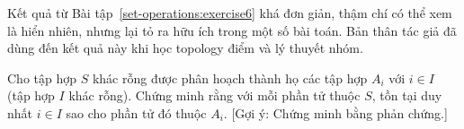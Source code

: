 Kết quả từ Bài tập~\ref{set-operations:exercise6} khá đơn giản, thậm chí có thể xem là hiển nhiên, nhưng lại tỏ ra hữu ích trong một số bài toán. Bản thân tác giả đã dùng đến kết quả này khi học topology điểm và lý thuyết nhóm.

\begin{exercise}\label{set-operations:exercise7}
    Cho tập hợp $S$ khác rỗng được phân hoạch thành họ các tập hợp $A_{i}$ với $i\in I$ (tập hợp $I$ khác rỗng). Chứng minh rằng với mỗi phần tử thuộc $S$, tồn tại duy nhất $i\in I$ sao cho phần tử đó thuộc $A_{i}$. [Gợi ý: Chứng minh bằng phản chứng.]
\end{exercise}
